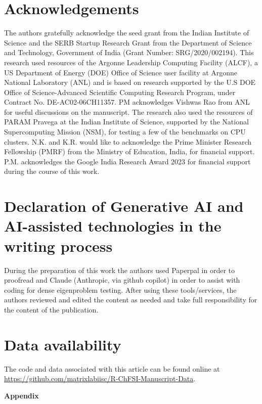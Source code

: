 \documentclass[preprint,3p,number,sort&compress]{elsarticle}
\begin{document}
\section{Acknowledgements}
The authors gratefully acknowledge the seed grant from the Indian Institute of Science and the SERB Startup Research Grant from the Department of Science and Technology, Government of India (Grant Number: SRG/2020/002194). This research used resources of the Argonne Leadership Computing Facility (ALCF), a US Department of Energy (DOE) Office of Science user facility at Argonne National Laboratory (ANL) and is based on research supported by the U.S DOE Office of Science-Advanced Scientific Computing Research Program, under Contract No. DE-AC02-06CH11357. PM acknowledges Vishwas Rao from ANL for useful discussions on the manuscript. The research also used the resources of PARAM Pravega at the Indian Institute of Science, supported by the National Supercomputing Mission (NSM), for testing a few of the benchmarks on CPU clusters. N.K. and K.R. would like to acknowledge the Prime Minister Research Fellowship (PMRF) from the Ministry of Education, India, for financial support. P.M. acknowledges the Google India Research Award 2023 for financial support during the course of this work.

\section{Declaration of Generative AI and AI-assisted technologies in the writing process}
During the preparation of this work the authors used Paperpal in order to proofread and Claude (Anthropic, via github copilot) in order to assist with coding for dense eigenproblem testing. After using these tools/services, the authors reviewed and edited the content as needed and take full responsibility for the content of the publication.

\section{Data availability}
The code and data associated with this article can be found online at \url{https://github.com/matrixlabiisc/R-ChFSI-Manuscript-Data}.
\newpage
\appendix
\vspace{0.1in} 
\begin{center}
\textbf{Appendix}
\end{center}
\end{document}
